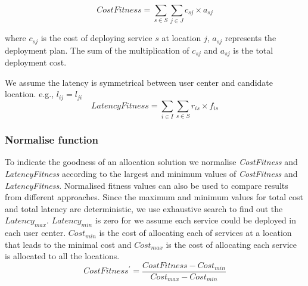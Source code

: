 \documentclass{llncs}
\begin{document}
\begin{flushleft}
\begin{flushleft}
\begin{equation}
	CostFitness = \sum\limits_{s \in S} \sum\limits_{j \in J} c_{sj} \times a_{sj}
\end{equation}

\begin{flushleft}where $c_{sj}$ is the cost of deploying service $s$ at location $j$, $a_{sj}$ represents the deployment plan. The sum of the multiplication of 
$c_{sj}$ and $a_{sj}$ is the total deployment cost.\end{flushleft}



We assume the latency is symmetrical between user center and candidate location.
e.g., $l_{ij} = l_{ji}$
	\begin{equation}
		LatencyFitness = \sum\limits_{i \in I} \sum\limits_{s \in S} r_{is} \times f_{is}
	\end{equation}

\vspace*{-1em}
\subsubsection{Normalise function}
To indicate the goodness of an allocation solution we normalise \emph{CostFitness} and \emph{LatencyFitness} according to the largest and minimum values of
\emph{CostFitness} and \emph{LatencyFitness}. Normalised fitness values can also be used to compare results from different approaches.
Since the maximum and minimum values for total cost and total latency are deterministic, we use exhaustive search to
find out the $Latency_{max}$. $Latency_{min}$ is zero for we assume each service could be deployed in each user center. 
$Cost_{min}$ is the cost of allocating each of services at a location that leads to the minimal cost and $Cost_{max}$ is the cost of allocating each service is allocated to all the 
locations.
	\begin{equation}
		\label{eq:cost_prime}
		CostFitness^\prime = \frac{CostFitness - Cost_{min}}{Cost_{max} - Cost_{min}}
	\end{equation}


\end{flushleft}
\end{flushleft}
\end{document}
